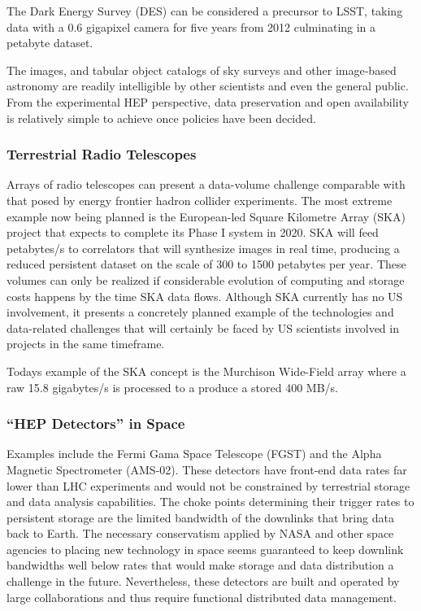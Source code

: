 The Dark Energy Survey (DES) can be considered a precursor to LSST, taking data with a 0.6 gigapixel camera for five years from 2012 culminating in a petabyte dataset.

The images, and tabular object catalogs of sky surveys and other image-based astronomy are readily intelligible by other scientists and even the general public.  From the experimental HEP perspective, data preservation and open availability is relatively simple to achieve once policies have been decided.

\subsubsection{Terrestrial Radio Telescopes}
Arrays of radio telescopes can present a data-volume challenge comparable with that posed by energy frontier hadron collider experiments.  The most extreme example now being planned is the European-led Square Kilometre Array (SKA) project that expects to complete its Phase I system in 2020. SKA will feed petabytes/s to correlators that will synthesize images in real time, producing a reduced persistent dataset on the scale of 300 to 1500 petabytes per year.  These volumes can only be realized if considerable evolution of computing and storage costs happens by the time SKA data flows.  Although SKA currently has no US involvement, it presents a concretely planned example of the technologies and data-related challenges that will certainly be faced by US scientists involved in projects in the same timeframe.

Todays example of the SKA concept is the Murchison Wide-Field array where a raw 15.8 gigabytes/s is processed to a produce a stored 400 MB/s.

\subsubsection{“HEP Detectors” in Space}
Examples include the Fermi Gama Space Telescope (FGST) and the Alpha Magnetic Spectrometer (AMS-02).  These detectors have front-end data rates far lower than LHC experiments and would not be constrained by terrestrial storage and data analysis capabilities.  The choke points determining their trigger rates to persistent storage are the limited bandwidth of the downlinks that bring data back to Earth.  The necessary conservatism applied by NASA and other space agencies to placing new technology in space seems guaranteed to keep downlink bandwidths well below rates that would make storage and data distribution a challenge in the future.  Nevertheless, these detectors are built and operated by large collaborations and thus require functional distributed data management.

